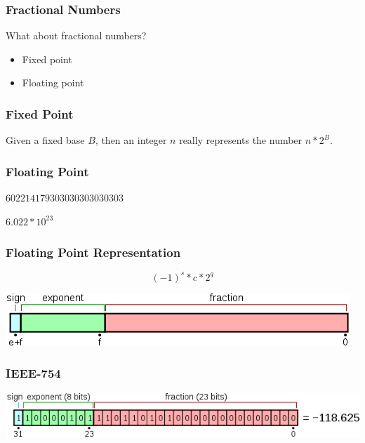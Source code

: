 \begin{frame}[fragile]
\frametitle{Fractional Numbers}

What about fractional numbers?

\begin{itemize}
\item Fixed point
\item Floating point
\end{itemize}

\end{frame}

\begin{frame}[fragile]
\frametitle{Fixed Point}

Given a fixed base $B$, then an integer $n$ really represents the number $n * 2^B$.


\end{frame}

\begin{frame}[fragile]
\frametitle{Floating Point}

$602214179303030303030303$

\pause
$6.022 * 10^{23}$
\end{frame}

\begin{frame}[fragile]
\frametitle{Floating Point Representation}

\[
(-1)^s * c * 2^q
\]

\centering
\includegraphics{images/FP-format.png}

\end{frame}

\begin{frame}[fragile]
\frametitle{IEEE-754}

\centering
\includegraphics{images/FP-example.png}

\end{frame}

